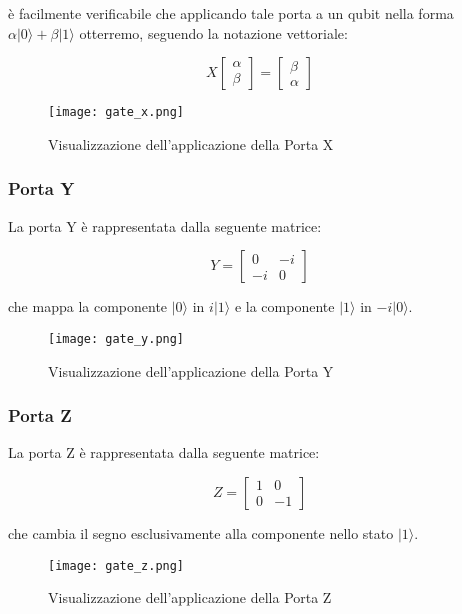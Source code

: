 è facilmente verificabile che applicando tale porta a un qubit nella forma \( \alpha | 0 \rangle + \beta | 1 \rangle \) otterremo, seguendo la notazione vettoriale:

\[
  X
  \begin{bmatrix}
    \alpha \\ \beta
  \end{bmatrix}
  =
  \begin{bmatrix}
    \beta \\ \alpha
  \end{bmatrix}
\]

\begin{figure}[h]
  \centering
  \texttt{[image: gate\_x.png]}
  \caption{Visualizzazione dell'applicazione della Porta X}
  \label{fig:gate_x}
\end{figure}

\subsubsection{Porta Y}
La porta Y è rappresentata dalla seguente matrice:

\[
  Y
  =
  \begin{bmatrix}
    0 & -i \\
    -i & 0
  \end{bmatrix}
\]

che mappa la componente \( | 0 \rangle \) in \( i | 1 \rangle \) e la componente \( | 1 \rangle \) in \( -i | 0 \rangle \).

\begin{figure}[h]
  \centering
  \texttt{[image: gate\_y.png]}
  \caption{Visualizzazione dell'applicazione della Porta Y}
  \label{fig:gate_y}
\end{figure}

\subsubsection{Porta Z}
La porta Z è rappresentata dalla seguente matrice:

\[
  Z
  =
  \begin{bmatrix}
    1 & 0 \\
    0 & -1
  \end{bmatrix}
\]

che cambia il segno esclusivamente alla componente nello stato \( | 1 \rangle \).

\begin{figure}[h]
  \centering
  \texttt{[image: gate\_z.png]}
  \caption{Visualizzazione dell'applicazione della Porta Z}
  \label{fig:gate_z}
\end{figure}

